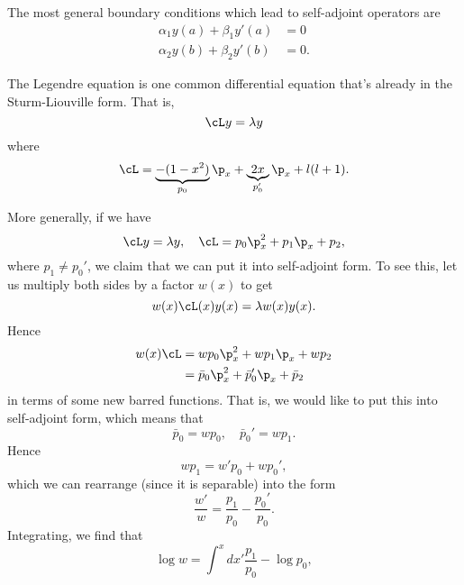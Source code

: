 The most general boundary conditions which lead to self-adjoint operators are
\begin{subequations}
\begin{align}
    \alpha_1 y(a) + \beta_1 y'(a) &= 0\\
    \alpha_2 y(b) + \beta_2 y'(b) &= 0.
\end{align}
\end{subequations}

\begin{exm}
    The Legendre equation is one common differential equation that's already in the Sturm-Liouville form. That is,
    \begin{equation}
        \cL y = \lambda y
    \end{equation}
    where
    \begin{equation}
        \cL = \underbrace{-(1-x^2)}_{p_0} \p_x + \underbrace{2 x}_{p_0'} \p_x +l(l+1).
    \end{equation}
\end{exm}
More generally, if we have
\begin{equation}
    \cL y = \lambda y, \quad \cL = p_0 \p_x^2 + p_1 \p_x + p_2,
\end{equation}
where $p_1 \neq p_0'$, we claim that we can put it into self-adjoint form. To see this, let us multiply both sides by a factor $w(x)$ to get
\begin{equation}
    w(x) \cL(x) y(x) = \lambda w(x) y(x).
\end{equation}
Hence
\begin{align}
    w(x) \cL &= w p_0 \p_x^2 + w p_1 \p_x + w p_2\\
        &= \bar p_0 \p_x^2 + \bar p_0' \p_x + \bar p_2
\end{align}
in terms of some new barred functions. That is, we would like to put this into self-adjoint form, which means that
\begin{equation}
    \bar p_0 = w p_0,\quad \bar p_0' = w p_1.
\end{equation}
Hence
\begin{equation}
    wp_1 = w' p_0 + w p_0',
\end{equation}
which we can rearrange (since it is separable) into the form
\begin{equation}
    \frac{w'}{w} = \frac{p_1}{p_0} -\frac{p_0'}{p_0}.
\end{equation}
Integrating, we find that
\begin{equation}
    \log w = \int^x dx' \frac{p_1}{p_0} -\log p_0,
\end{equation}
